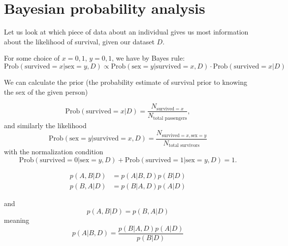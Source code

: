 \documentclass{book}
\begin{document}
\section*{Bayesian probability analysis}
Let us look at which piece of data about an individual gives us most information 
about the likelihood of survival, given our dataset $D$.

For some choice of $x=0,1$, $y=0,1$, we have by Bayes rule:
\begin{equation}
    \text{Prob}(\text{survived}=x | \text{sex}=y, D) \propto \text{Prob}( \text{sex}=y|\text{survived}=x,D ) \cdot \text{Prob}(\text{survived}=x|D)
\end{equation}

We can calculate the prior (the probability estimate of survival prior to knowing the sex of the given person)

\begin{equation}
    \text{Prob}(\text{survived}=x|D) = \frac{N_{\text{survived}=x}}{N_\text{total passengers}},
\end{equation}
and similarly the likelihood
\begin{equation}
    \text{Prob}(\text{sex}=y|\text{survived}=x, D) = \frac{N_{\text{survived}=x, \text{sex}=y}}{N_\text{total survivors}}
\end{equation}
with the normalization condition 
\begin{equation}
    \text{Prob}(\text{survived}=0|\text{sex}=y, D) + \text{Prob}(\text{survived}=1|\text{sex}=y, D) = 1.
\end{equation}






\clearpage
\begin{equation}
    \begin{split}
        p(A,B|D) & = p(A|B,D)p(B|D) \\
        p(B,A|D) & = p(B|A,D)p(A|D)
    \end{split}
\end{equation}

and
\begin{equation}
    p(A,B|D) = p(B,A|D)
\end{equation}
meaning 
\begin{equation}
    p(A|B,D) =  \frac{p(B|A,D)p(A|D)}{p(B|D)}
\end{equation}
\end{document}

